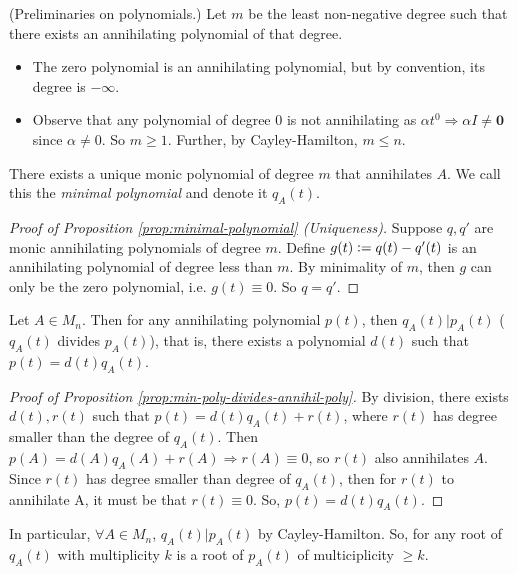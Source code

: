 \noindent (Preliminaries on polynomials.) Let $m$ be the least non-negative degree such that there exists an annihilating polynomial of that degree.
\begin{itemize}
    \item The zero polynomial is an annihilating polynomial, but by convention, its degree is $-\infty$.
    \item Observe that any polynomial of degree 0 is not annihilating as $\alpha t^0 \Longrightarrow \alpha I \not=\mathbf{0}$ since $\alpha \not= 0$. So $m \geq 1$. Further, by Cayley-Hamilton, $m \leq n$.
\end{itemize}

\begin{proposition}
\label{prop:minimal-polynomial}
There exists a unique monic polynomial of degree $m$ that annihilates $A$. We call this the \textit{minimal polynomial} and denote it $q_A(t)$.
\end{proposition}

\begin{proof}[Proof of Proposition \ref{prop:minimal-polynomial} (Uniqueness)]
Suppose $q, q'$ are monic annihilating polynomials of degree $m$. Define $g(t) \vcentcolon= q(t) - q'(t)$ is an annihilating polynomial of degree less than $m$. By minimality of $m$, then $g$ can only be the zero polynomial, i.e. $g(t) \equiv 0$. So $q = q'$.
\end{proof}

\begin{proposition}
\label{prop:min-poly-divides-annihil-poly}
Let $A \in M_n$. Then for any annihilating polynomial $p(t)$, then $q_A(t) | p_A(t)$ ($q_A(t)$ divides $p_A(t)$), that is, there exists a polynomial $d(t)$ such that $p(t) = d(t) q_A(t)$. 
\end{proposition}
\begin{proof}[Proof of Proposition \ref{prop:min-poly-divides-annihil-poly}]
By division, there exists $d(t), r(t)$ such that $p(t) = d(t)q_A(t) + r(t)$, where $r(t)$ has degree smaller than the degree of $q_A(t)$. Then $p(A) = d(A)q_A(A) + r(A) \Longrightarrow r(A) \equiv 0$, so $r(t)$ also annihilates $A$. Since $r(t)$ has degree smaller than degree of $q_A(t)$, then for $r(t)$ to annihilate A, it must be that $r(t) \equiv 0$. So, $p(t) = d(t) q_A(t)$.
\end{proof}

\begin{note*}
In particular, $\forall A \in M_n$, $q_A(t)|p_A(t)$ by Cayley-Hamilton. So, for any root of $q_A(t)$ with multiplicity $k$ is a root of $p_A(t)$ of multiciplicity $\geq k$.
\end{note*}

